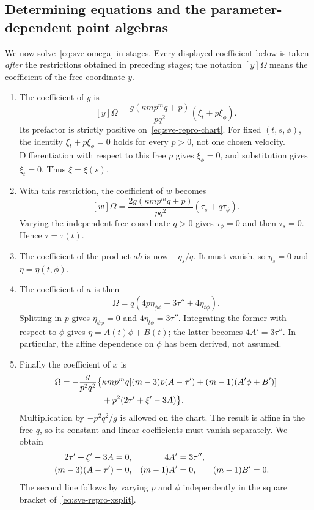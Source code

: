 \subsection{Determining equations and the parameter-dependent point algebras}
We now solve~\eqref{eq:sve-omega} in stages. Every displayed coefficient
below is taken \emph{after} the restrictions obtained in preceding stages;
the notation $[y]\Omega$ means the coefficient of the free coordinate $y$.
\begin{enumerate}
\item The coefficient of $y$ is
\[
 [y]\Omega=\frac{g(\kappa mp^mq+p)}{pq^2}(\xi_t+p\xi_\phi).
\]
Its prefactor is strictly positive on~\eqref{eq:sve-repro-chart}.
For fixed $(t,s,\phi)$, the identity $\xi_t+p\xi_\phi=0$ holds for
every $p>0$, not one chosen velocity. Differentiation with respect to this
free $p$ gives $\xi_\phi=0$, and substitution gives $\xi_t=0$.
Thus $\xi=\xi(s)$.
\item With this restriction, the coefficient of $w$ becomes
\[
 [w]\Omega=\frac{2g(\kappa mp^mq+p)}{pq^2}(\tau_s+q\tau_\phi).
\]
Varying the independent free coordinate $q>0$ gives $\tau_\phi=0$
and then $\tau_s=0$. Hence $\tau=\tau(t)$.
\item The coefficient of the product $ab$ is now $-\eta_s/q$.
It must vanish, so $\eta_s=0$ and $\eta=\eta(t,\phi)$.
\item The coefficient of $a$ is then
\begin{equation}
 [a]\Omega=q(4p\eta_{\phi\phi}-3\tau''+4\eta_{t\phi}).
 \label{eq:sve-repro-split}
\end{equation}
Splitting in $p$ gives $\eta_{\phi\phi}=0$ and
$4\eta_{t\phi}=3\tau''$. Integrating the former with respect to
$\phi$ gives $\eta=A(t)\phi+B(t)$; the latter becomes $4A'=3\tau''$.
In particular, the affine dependence on $\phi$ has been derived, not assumed.
\item Finally the coefficient of $x$ is
\begin{align}
 [x]\Omega=-\frac{g}{p^2q^2}\big\{&\kappa mp^mq
     [(m-3)p(A-\tau')+(m-1)(A'\phi+B')]\notag\\
     &+p^2(2\tau'+\xi'-3A)\big\}.
 \label{eq:sve-repro-xsplit}
\end{align}
Multiplication by $-p^2q^2/g$ is allowed on the chart. The result is
affine in the free $q$, so its constant and linear coefficients must
vanish separately. We obtain
\begin{align}
 2\tau'+\xi'-3A&=0, &4A'&=3\tau'',\notag\\
 (m-3)(A-\tau')&=0,&(m-1)A'&=0,&(m-1)B'&=0.
 \label{eq:sve-final-determining}
\end{align}
The second line follows by varying $p$ and $\phi$ independently in the
square bracket of~\eqref{eq:sve-repro-xsplit}.
\end{enumerate}
